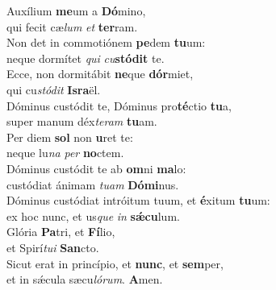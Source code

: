 \evenverse Auxílium \textbf{me}um a \textbf{Dó}mino,~\*\\
\evenverse qui fecit cæ\textit{lum} \textit{et} \textbf{ter}ram.\\
\oddverse Non det in commotiónem \textbf{pe}dem \textbf{tu}um:~\*\\
\oddverse neque dormítet \textit{qui} \textit{cu}\textbf{stó}\textbf{dit} te.\\
\evenverse Ecce, non dormitábit \textbf{ne}que \textbf{dór}miet,~\*\\
\evenverse qui cu\textit{stó}\textit{dit} \textbf{Is}\textbf{ra}ël.\\
\oddverse Dóminus custódit te, Dóminus pro\textbf{té}ctio \textbf{tu}a,~\*\\
\oddverse super manum déx\textit{te}\textit{ram} \textbf{tu}am.\\
\evenverse Per diem \textbf{sol} non \textbf{u}ret te:~\*\\
\evenverse neque lu\textit{na} \textit{per} \textbf{no}ctem.\\
\oddverse Dóminus custódit te ab \textbf{om}ni \textbf{ma}lo:~\*\\
\oddverse custódiat ánimam \textit{tu}\textit{am} \textbf{Dó}\textbf{mi}nus.\\
\evenverse Dóminus custódiat intróitum tuum, et \textbf{é}xitum \textbf{tu}um:~\*\\
\evenverse ex hoc nunc, et us\textit{que} \textit{in} \textbf{sǽ}\textbf{cu}lum.\\
\oddverse Glória \textbf{Pa}tri, et \textbf{Fí}lio,~\*\\
\oddverse et Spirí\textit{tu}\textit{i} \textbf{San}cto.\\
\evenverse Sicut erat in princípio, et \textbf{nunc}, et \textbf{sem}per,~\*\\
\evenverse et in sǽcula sæcu\textit{ló}\textit{rum}. \textbf{A}men.\\
